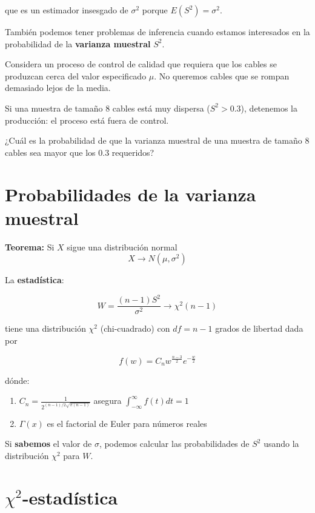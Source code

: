 \documentclass[
]{book}
\providecommand{\tightlist}{%
  \setlength{\itemsep}{0pt}\setlength{\parskip}{0pt}}
\begin{document}
que es un estimador insesgado de \(\sigma^2\) porque \(E(S^2)=\sigma^2\).

También podemos tener problemas de inferencia cuando estamos interesados en la probabilidad de la \textbf{varianza muestral} \(S^2\).

Considera un proceso de control de calidad que requiera que los cables se produzcan cerca del valor especificado \(\mu\). No queremos cables que se rompan demasiado lejos de la media.

Si una muestra de tamaño \(8\) cables está muy dispersa (\(S^2>0.3\)), detenemos la producción: el proceso está fuera de control.

¿Cuál es la probabilidad de que la varianza muestral de una muestra de tamaño \(8\) cables sea mayor que los \(0.3\) requeridos?

\hypertarget{probabilidades-de-la-varianza-muestral}{%
\section{Probabilidades de la varianza muestral}\label{probabilidades-de-la-varianza-muestral}}

\textbf{Teorema:} Si \(X\) sigue una distribución normal
\[X \rightarrow N(\mu, \sigma^2)\]

La \textbf{estadística}:

\[W=\frac{(n-1)S^2}{\sigma^2} \rightarrow \chi^2(n-1)\]

tiene una distribución \(\chi^2\) (chi-cuadrado) con \(df=n-1\) grados de libertad dada por

\[f(w)=C_n w^{\frac{n-3}{2}} e^{-\frac{w}{2}}\]

dónde:

\begin{enumerate}
\def\labelenumi{\arabic{enumi})}
\tightlist
\item
  \(C_n=\frac{1}{2^{(n-1)/2\sqrt{\pi(n-1)}}}\) asegura \(\int_{-\infty}^{\infty} f (t)dt=1\)
\item
  \(\Gamma(x)\) es el factorial de Euler para números reales
\end{enumerate}

Si \textbf{sabemos} el valor de \(\sigma\), podemos calcular las probabilidades de \(S^2\) usando la distribución \(\chi^2\) para \(W\).

\hypertarget{chi2-estaduxedstica}{%
\section{\texorpdfstring{\(\chi^2\)-estadística}{\textbackslash chi\^{}2-estadística}}\label{chi2-estaduxedstica}}
\end{document}
